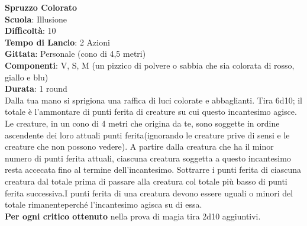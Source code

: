 \begin{multicols}{2}
\medskip\textbf{Spruzzo Colorato}\\
\textbf{Scuola}: Illusione\\
\textbf{Difficoltà}:  10\\
\textbf{Tempo di Lancio}: 2 Azioni\\
\textbf{Gittata}: Personale (cono di 4,5 metri)\\
\textbf{Componenti}: V, S, M (un pizzico di polvere o sabbia che sia colorata di rosso, giallo e blu)\\
\textbf{Durata}: 1 round\\
Dalla tua mano si sprigiona una raffica di luci colorate e abbaglianti. Tira 6d10; il totale è l’ammontare di punti ferita di creature su cui questo incantesimo agisce. Le creature, in un cono di 4 metri che origina da te, sono soggette in ordine ascendente dei loro attuali punti ferita(ignorando le creature prive di sensi e le creature  che non possono vedere). A partire dalla creatura che ha il minor numero di punti ferita attuali, ciascuna creatura soggetta a questo incantesimo resta accecata fino al termine dell'incantesimo. Sottrarre i punti ferita di ciascuna creatura dal totale prima di passare alla creatura col totale più basso di punti ferita successiva.I punti ferita  di una creatura devono essere uguali o minori del totale rimanenteperché  l'incantesimo agisca su di essa. \\
\textbf{Per ogni critico ottenuto} nella prova di magia tira 2d10 aggiuntivi.


\end{multicols}
